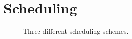 \section{Scheduling}

\begin{figure}
\centering
{}
\caption{Three different scheduling schemes.}
\label{fig:sched}
\end{figure}


